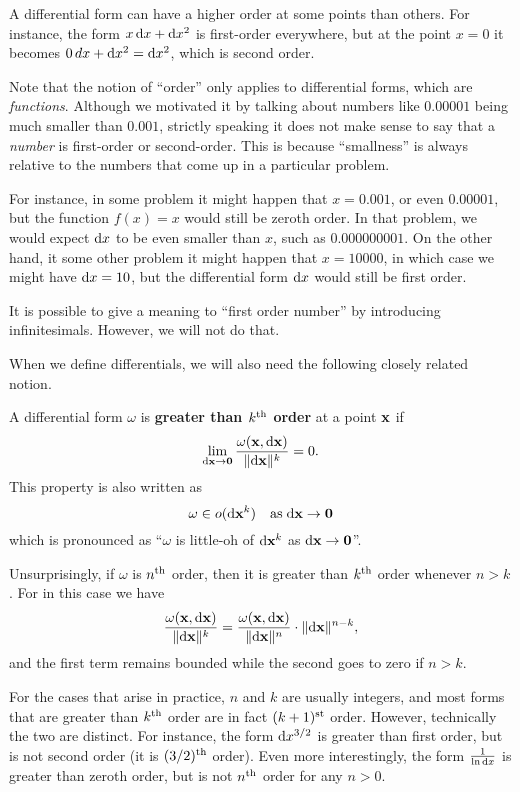 \documentclass[12pt]{amsart}
\begin{document}
\begin{eg}
  A differential form can have a higher order at some points than others.
  For instance, the form $x \,\mathrm{d} x + \mathrm{d} x^2$ is first-order everywhere, but at the point $x=0$ it becomes $0\, dx + \mathrm{d} x^2 = \mathrm{d} x^2$, which is second order.
\end{eg}

\begin{rmk}
  Note that the notion of ``order'' only applies to differential forms, which are \emph{functions}.
  Although we motivated it by talking about numbers like $0.00001$ being much smaller than $0.001$, strictly speaking it does not make sense to say that a \emph{number} is first-order or second-order.
  This is because ``smallness'' is always relative to the numbers that come up in a particular problem.

  For instance, in some problem it might happen that $x=0.001$, or even $0.00001$, but the function $f(x) = x$ would still be zeroth order.
  In that problem, we would expect $\mathrm{d} x$ to be even smaller than $x$, such as $0.000000001$.
  On the other hand, it some other problem it might happen that $x = 10000$, in which case we might have $\mathrm{d} x = 10$, but the differential form $\mathrm{d} x$ would still be first order.

  It is possible to give a meaning to ``first order number'' by introducing infinitesimals.
  However, we will not do that.
\end{rmk}

When we define differentials, we will also need the following closely related notion.

\begin{defn}
  A differential form $\omega$ is \textbf{greater than $k^{\mathrm{th}}$ order} at a point $\mathbf{x}$ if
  \[ \lim_{\mathrm{d} \mathbf{x}\to\mathbf{0}} \frac{\omega(\mathbf{x},\mathrm{d} \mathbf{x})}{\Vert \mathrm{d} \mathbf{x} \Vert^k} = 0. \]
  This property is also written as
  \[ \omega \in o(\mathrm{d} \mathbf{x}^k) \quad\text{as}\;\mathrm{d} \mathbf{x}\to\mathbf{0} \]
  which is pronounced as ``$\omega$ is little-oh of $\mathrm{d} \mathbf{x}^k$ as $\mathrm{d} \mathbf{x}\to\mathbf{0}$''.
\end{defn}

Unsurprisingly, if $\omega$ is $n^{\mathrm{th}}$ order, then it is greater than $k^{\mathrm{th}}$ order whenever $n>k$.
For in this case we have
\[\frac{\omega(\mathbf{x},\mathrm{d} \mathbf{x})}{\Vert \mathrm{d} \mathbf{x} \Vert^k} = \frac{\omega(\mathbf{x},\mathrm{d} \mathbf{x})}{\Vert \mathrm{d} \mathbf{x} \Vert^n} \cdot \Vert \mathrm{d} \mathbf{x} \Vert^{n-k}, \]
and the first term remains bounded while the second goes to zero if $n>k$.

For the cases that arise in practice, $n$ and $k$ are usually integers, and most forms that are greater than $k^{\mathrm{th}}$ order are in fact $(k+1)^{\mathrm{st}}$ order.
However, technically the two are distinct.
For instance, the form $\mathrm{d} x^{3/2}$ is greater than first order, but is not second order (it is $(3/2)^{\mathrm{th}}$ order).
Even more interestingly, the form $\frac{1}{\ln\mathrm{d} x}$ is greater than zeroth order, but is not $n^{\mathrm{th}}$ order for any $n>0$.
\end{document}
